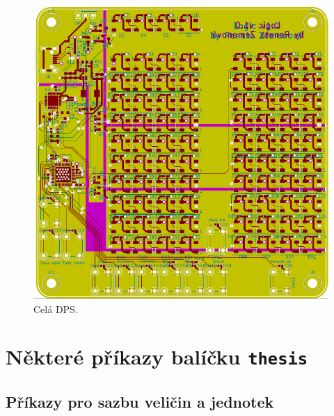   \begin{figure}[!h]
    \begin{center}
      \includegraphics[scale=0.9]{prilohy/Verze1_DPS_cela.png}
    \end{center}
    \caption[Celá DPS]{Celá DPS.}
  \end{figure}

\chapter{Některé příkazy balíčku \texttt{thesis}}

\section{Příkazy pro sazbu veličin a jednotek}

